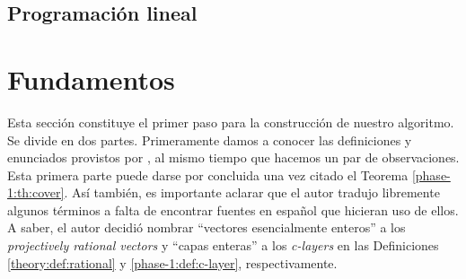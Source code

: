 
\subsection{Programación lineal}

\section{Fundamentos}
\noindent
Esta sección constituye el primer paso para la construcción de nuestro algoritmo. Se divide en dos
partes. Primeramente damos a conocer las definiciones y enunciados provistos por \cite{herr}, al
mismo tiempo que hacemos un par de observaciones. Esta primera parte puede darse por concluida una
vez citado el Teorema \ref{phase-1:th:cover}. Así también, es importante aclarar que el autor
tradujo libremente algunos términos a falta de encontrar fuentes en español que hicieran uso de
ellos. A saber, el autor decidió nombrar ``vectores esencialmente enteros'' a los
\textit{projectively rational vectors} y ``capas enteras'' a los \textit{c-layers} en las
Definiciones \ref{theory:def:rational} y \ref{phase-1:def:c-layer}, respectivamente.

